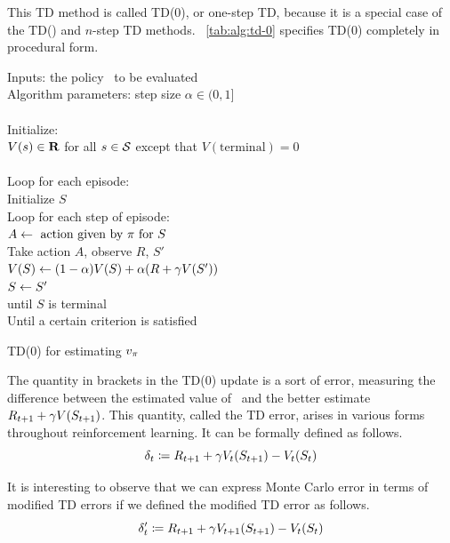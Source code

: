 This TD method is called TD(0),
or one-step TD,
because it is a special case of the TD(\tdparam)
and $n$-step TD methods.
\tablename~\ref{tab:alg:td-0} specifies TD(0) completely in procedural form.


\begin{table}
\beginalg
Inputs: the policy \pol\ to be evaluated\\
Algorithm parameters: step size $\alpha\in(0,1]$\\
\\
Initialize:\\
\>$V(s) \in \mathbf{R}$ for all $s \in \mathcal{S}$ except that $V(\mathrm{terminal}) = 0$ \\
\\
Loop for each episode:\\
\> Initialize $S$\\
\> Loop for each step of episode:\\
\> \> $A \leftarrow \mbox{ action given by } \pi \mbox{ for } S$\\
\> \> Take action $A$, observe $R$, $S'$\\
\> \> $V(S) \leftarrow (1-\alpha) V(S) + \alpha(R + \gamma V(S'))$\\
\> \> $S \leftarrow S'$\\
\> until $S$ is terminal\\
Until a certain criterion is satisfied
\endalg
\caption{TD(0) for estimating $v_{\pi}$}
\label{tab:alg:td-0}
\end{table}


The quantity in brackets in the TD(0) update is a sort of error,
measuring the difference between the estimated value of \
and the better estimate $R_{t+1} + \gamma V(S_{t+1})$.
This quantity, called the TD error, arises in various forms throughout reinforcement learning.
It can be formally defined as follows.
\begin{equation}
\label{eq:one-step-error}
\delta_{t} \coloneqq R_{t+1} + \gamma V_t(S_{t+1}) - V_t(S_{t})
\end{equation}

It is interesting to observe that we can express Monte Carlo error in terms of modified TD errors
if we defined the modified TD error as follows.
\begin{equation}
\label{eq:one-step-error-var}
\delta'_{t} \coloneqq R_{t+1} + \gamma V_{t+1}(S_{t+1}) - V_t(S_{t})
\end{equation}


